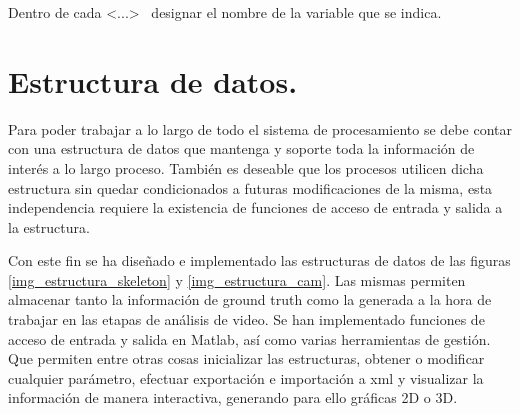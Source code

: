 %								

Dentro de cada <...>  ~designar el nombre de la variable que se indica.


\section{Estructura de datos.}
\label{section_Estructura_de_datos}
Para poder trabajar a lo largo de todo el sistema de procesamiento se debe contar con una estructura de datos que mantenga y soporte toda la información de interés a lo largo proceso. También es deseable que los procesos utilicen dicha estructura sin quedar condicionados a futuras modificaciones de la misma, esta independencia requiere la existencia de funciones de acceso de entrada y salida a la estructura.  


Con este fin se ha diseñado e implementado las estructuras de datos de las figuras \ref{img_estructura_skeleton} y \ref{img_estructura_cam}.
Las mismas permiten almacenar tanto la información de ground truth como la generada a la hora de  trabajar en las etapas de análisis de video. Se han implementado funciones de acceso de entrada y salida en Matlab, así como varias herramientas de gestión. Que permiten entre otras cosas inicializar las estructuras, obtener o modificar cualquier parámetro, efectuar exportación e importación a xml y visualizar la información de manera interactiva, generando para ello gráficas 2D o 3D. 


